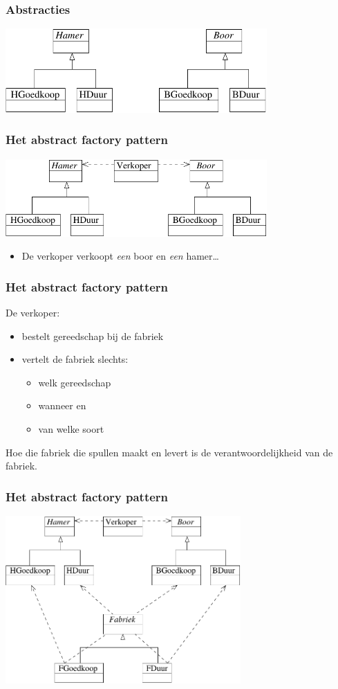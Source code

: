 \documentclass{beamer}
\begin{document}
\begin{frame}
\frametitle{Abstracties}
\begin{center}
\includegraphics[width=10cm]{af3}
\end{center}
\end{frame}

\begin{frame}
\frametitle{Het abstract factory pattern}
\begin{center}
\includegraphics[width=10cm]{af4}
\end{center}
\begin{itemize}
\item De verkoper verkoopt \emph{een} boor en \emph{een} hamer\ldots
\end{itemize}
\end{frame}

\begin{frame}
\frametitle{Het abstract factory pattern}
De verkoper:
\begin{itemize}
\item bestelt gereedschap bij de fabriek
\item vertelt de fabriek slechts:
  \begin{itemize}
  \item welk gereedschap 
  \item wanneer en
  \item van welke soort
  \end{itemize}
\end{itemize}
Hoe die fabriek die spullen maakt en levert is de verantwoordelijkheid van de fabriek.
\end{frame}


\begin{frame}
\frametitle{Het abstract factory pattern}
\begin{center}
\includegraphics[width=9cm]{af5}
\end{center}
\end{frame}
\end{document}
